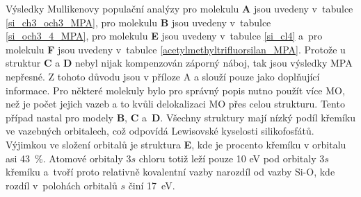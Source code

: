 \documentclass[
digital, %
table,   %
nolof,     %
nolot,     %
oneside,
]{fithesis3}
\begin{document}
\begin{figure}
\begin{center}
\label{prehled_nbo_si_ch3_oac_3}
\end{center}
\end{figure}

Výsledky Mullikenovy populační analýzy pro molekulu \textbf{A} jsou uvedeny v~tabulce \ref{si_ch3_och3_MPA}, pro molekulu \textbf{B} jsou uvedeny v~tabulce \ref{si_och3_4_MPA}, pro molekulu \textbf{E} jsou uvedeny v~tabulce \ref{si_cl4} a~pro molekulu \textbf{F} jsou uvedeny v~tabulce \ref{acetylmethyltrifluorsilan_MPA}. Protože u struktur \textbf{C} a \textbf{D} nebyl nijak kompenzován záporný náboj, tak jsou výsledky MPA nepřesné. Z tohoto důvodu jsou v příloze A a slouží pouze jako doplňující informace. Pro některé molekuly bylo pro správný popis nutno použít více MO, než je počet jejich vazeb a to kvůli delokalizaci MO přes celou strukturu. Tento případ nastal pro modely \textbf{B}, \textbf{C} a~\textbf{D}. Všechny struktury mají nízký podíl křemíku ve vazebných orbitalech, což odpovídá Lewisovské kyselosti silikofosfátů. Výjimkou ve složení orbitalů je struktura \textbf{E}, kde je procento křemíku v orbitalu asi 43~\%. Atomové orbitaly $3s$ chloru totiž leží pouze 10 eV pod orbitaly $3s$ křemíku a~tvoří proto relativně kovalentní vazby narozdíl od vazby Si-O, kde rozdíl v~polohách orbitalů $s$ činí 17~eV.
\end{document}
